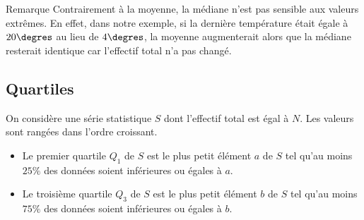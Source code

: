 \documentclass[xcolor={dvipsnames,svgnames,table}]{beamer}
\begin{document}
\begin{frame}{Remarque}
    Contrairement à la moyenne, la médiane n'est pas sensible aux valeurs extrêmes. En effet, dans notre exemple, si la dernière température était égale à $20\degres$ au lieu de $4\degres$, la moyenne augmenterait alors que la médiane resterait identique car l'effectif total n'a pas changé.
\end{frame}

\subsection{Quartiles}

\begin{frame}
    \begin{Definition}
        On considère une série statistique $S$ dont l'effectif total est égal à $N$. Les valeurs sont rangées dans l'ordre croissant.\pause
        \begin{itemize}[<+->]
            \item Le \alert{premier quartile} $Q_1$ de $S$ est le plus petit élément $a$ de $S$ tel qu'au moins $25\%$ des données soient inférieures ou égales à $a$.
            \item Le \alert{troisième quartile} $Q_3$ de $S$ est le plus petit élément $b$ de $S$ tel qu'au moins $75\%$ des données soient inférieures ou égales à $b$.
        \end{itemize}
    \end{Definition}
\end{frame}
\end{document}

